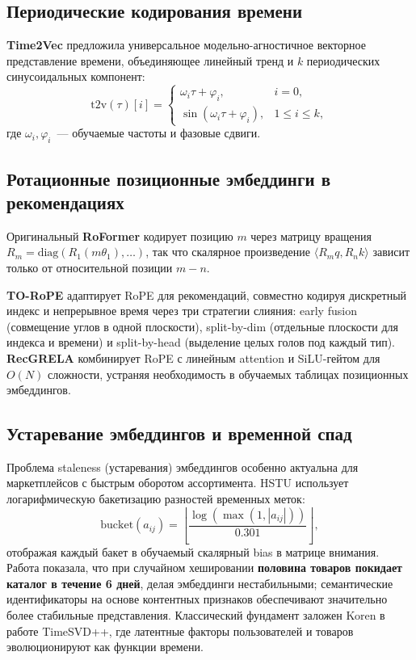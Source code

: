 \subsection{Периодические кодирования времени}
\label{subsec:ch1:time_encoding}

\textbf{Time2Vec} \cite{kazemi2020time2vec} предложила универсальное модельно-агностичное векторное представление времени, объединяющее линейный тренд и $k$ периодических синусоидальных компонент:
\begin{equation}
    \text{t2v}(\tau)[i] = \begin{cases}
        \omega_i \tau + \varphi_i, & i = 0, \\
        \sin(\omega_i \tau + \varphi_i), & 1 \leq i \leq k,
    \end{cases}
\end{equation}
где $\omega_i, \varphi_i$~--- обучаемые частоты и фазовые сдвиги.

\subsection{Ротационные позиционные эмбеддинги в рекомендациях}
\label{subsec:ch1:rope}

Оригинальный \textbf{RoFormer} \cite{su2021roformer} кодирует позицию $m$ через матрицу вращения $R_m = \text{diag}(R_1(m\theta_1), \ldots)$, так что скалярное произведение $\langle R_m q, R_n k \rangle$ зависит только от относительной позиции $m - n$.

\textbf{TO-RoPE} \cite{wei2025torope} адаптирует RoPE для рекомендаций, совместно кодируя дискретный индекс и непрерывное время через три стратегии слияния: early fusion (совмещение углов в одной плоскости), split-by-dim (отдельные плоскости для индекса и времени) и split-by-head (выделение целых голов под каждый тип). 
\textbf{RecGRELA} \cite{hu2025recgrela} комбинирует RoPE с линейным attention и SiLU-гейтом для $O(N)$ сложности, устраняя необходимость в обучаемых таблицах позиционных эмбеддингов.

\subsection{Устаревание эмбеддингов и временной спад}
\label{subsec:ch1:staleness}

Проблема staleness (устаревания) эмбеддингов особенно актуальна для маркетплейсов с быстрым оборотом ассортимента. 
HSTU \cite{zhai2024hstu} использует логарифмическую бакетизацию разностей временных меток:
\begin{equation}
    \text{bucket}(a_{ij}) = \left\lfloor \frac{\log(\max(1, |a_{ij}|))}{0.301} \right\rfloor,
\end{equation}
отображая каждый бакет в обучаемый скалярный bias в матрице внимания. 
Работа \cite{meta2025semantic} показала, что при случайном хешировании \textbf{половина товаров покидает каталог в течение 6 дней}, делая эмбеддинги нестабильными; 
семантические идентификаторы на основе контентных признаков обеспечивают значительно более стабильные представления. 
Классический фундамент заложен Koren \cite{koren2009timeSVD} в работе TimeSVD++, где латентные факторы пользователей и товаров эволюционируют как функции времени.

